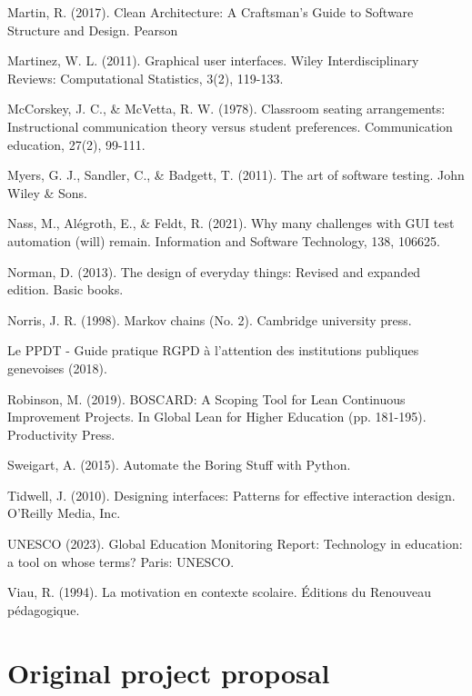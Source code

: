 \documentclass[10pt]{article}
\begin{document}
\begin{thebibliography}{Xyzz12}
 Martin, R. (2017). Clean Architecture: A Craftsman’s Guide to Software Structure and Design. Pearson

 Martinez, W. L. (2011). Graphical user interfaces. Wiley Interdisciplinary Reviews: Computational Statistics, 3(2), 119-133.

 McCorskey, J. C., \& McVetta, R. W. (1978). Classroom seating arrangements: Instructional communication theory versus student preferences. Communication education, 27(2), 99-111.

 Myers, G. J., Sandler, C., \& Badgett, T. (2011). The art of software testing. John Wiley \& Sons.

 Nass, M., Alégroth, E., \& Feldt, R. (2021). Why many challenges with GUI test automation (will) remain. Information and Software Technology, 138, 106625.

 Norman, D. (2013). The design of everyday things: Revised and expanded edition. Basic books.

 Norris, J. R. (1998). Markov chains (No. 2). Cambridge university press.

 Le PPDT - Guide pratique RGPD à l'attention des institutions publiques genevoises (2018).

 Robinson, M. (2019). BOSCARD: A Scoping Tool for Lean Continuous Improvement Projects. In Global Lean for Higher Education (pp. 181-195). Productivity Press.

 Sweigart, A. (2015). Automate the Boring Stuff with Python.

Tidwell, J. (2010). Designing interfaces: Patterns for effective interaction design. O'Reilly Media, Inc.

 UNESCO (2023). Global Education Monitoring Report: Technology in education: a tool on whose terms? Paris: UNESCO.

 Viau, R. (1994). La motivation en contexte scolaire. Éditions du Renouveau pédagogique.

\end{thebibliography}

\appendix

\section{Original project proposal}
\end{document}
